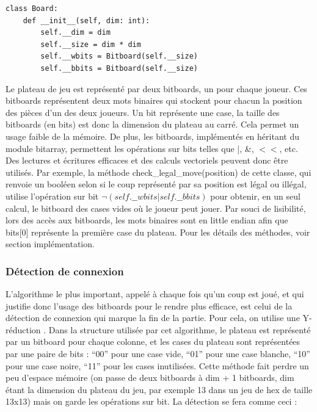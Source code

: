 \documentclass[12pt]{article}
\begin{document}
\begin{lstlisting}[style = PythonStyle]
class Board:
    def __init__(self, dim: int):
    	self.__dim = dim
    	self.__size = dim * dim
    	self.__wbits = Bitboard(self.__size)
    	self.__bbits = Bitboard(self.__size)
\end{lstlisting}

\bigskip
Le plateau de jeu est représenté par deux bitboards, un pour chaque joueur. Ces bitboards représentent deux mots binaires qui stockent pour chacun la position des pièces d’un des deux joueurs. Un bit représente une case, la taille des bitboards (en bits) est donc la dimension du plateau au carré. Cela permet un usage faible de la mémoire. De plus, les bitboards, implémentés en héritant du module bitarray, permettent les opérations sur bits telles que |, \&, $<<$, etc. Des lectures et écritures efficaces et des calculs vectoriels peuvent donc être utilisés. Par exemple, la méthode check\_legal\_move(position) de cette classe, qui renvoie un booléen selon si le coup représenté par sa position est légal ou illégal, utilise l’opération sur bit  $\neg(self.\_\_wbits | self.\_\_bbits)$ pour obtenir, en un seul calcul, le bitboard des cases vides où le joueur peut jouer. Par souci de lisibilité, lors des accès aux bitboards, les mots binaires sont en little endian afin que bits[0] représente la première case du plateau. Pour les détails des méthodes, voir section implémentation.

\subsubsection{Détection de connexion} \label{algo-bpr}

L’algorithme le plus important, appelé à chaque fois qu’un coup est joué, et qui justifie donc l’usage des bitboards pour le rendre plus efficace, est celui de la détection de connexion qui marque la fin de la partie.
Pour cela, on utilise une Y-réduction \cite{browne12}. Dans la structure utilisée par cet algorithme, le plateau est représenté par un bitboard pour chaque colonne, et les cases du plateau sont représentées par une paire de bits : “00” pour une case vide, “01” pour une case blanche, “10” pour une case noire, “11” pour les cases inutilisées. Cette méthode fait perdre un peu d’espace mémoire (on passe de deux bitboards à dim + 1 bitboards, dim étant la dimension du plateau du jeu, par exemple 13 dans un jeu de hex de taille 13x13) mais on garde les opérations sur bit. La détection se fera comme ceci : 
\end{document}
